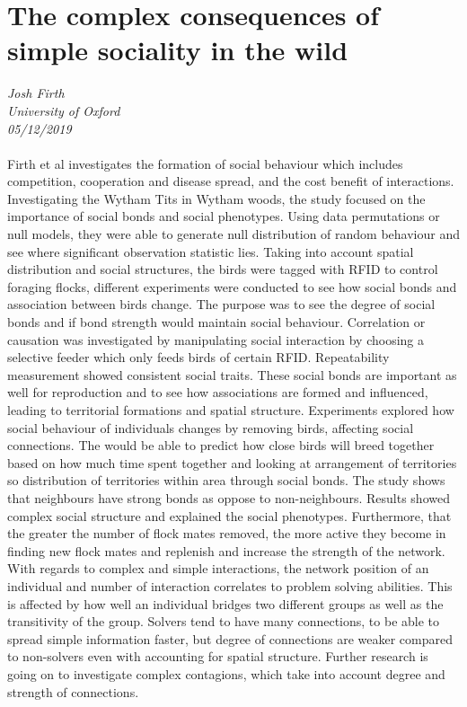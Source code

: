 \documentclass[11pt]{article}
\begin{document}
\section{The complex consequences of simple sociality in the wild}
\textit{Josh Firth\\University of Oxford\\05/12/2019}
\\
\\Firth et al investigates the formation of social behaviour which includes competition, cooperation and disease spread, and the cost benefit of interactions. Investigating the Wytham Tits in Wytham woods, the study focused on the importance of social bonds and social phenotypes. Using data permutations or null models, they were able to generate null distribution of random behaviour and see where significant observation statistic lies. Taking into account spatial distribution and social structures, the birds were tagged with RFID to control foraging flocks, different experiments were conducted to see how social bonds and association between birds change. The purpose was to see the degree of social bonds and if bond strength would maintain social behaviour. Correlation or causation was investigated by manipulating social interaction by choosing a selective feeder which only feeds birds of certain RFID. Repeatability measurement showed consistent social traits. These social bonds are important as well for reproduction and to see how associations are formed and influenced, leading to territorial formations and spatial structure. Experiments explored how social behaviour of individuals changes by removing birds, affecting social connections. The would be able to predict how close birds will breed together based on how much time spent together and looking at arrangement of territories so distribution of territories within area through social bonds. The study shows that neighbours have strong bonds as oppose to non-neighbours. Results showed complex social structure and explained the social phenotypes. Furthermore, that the greater the number of flock mates removed, the more active they become in finding new flock mates and replenish and increase the strength of the network. With regards to complex and simple interactions, the network position of an individual and number of interaction correlates to problem solving abilities. This is affected by how well an individual bridges two different groups as well as the transitivity of the group. Solvers tend to have many connections, to be able to spread simple information faster, but degree of connections are weaker compared to non-solvers even with accounting for spatial structure. Further research is going on to investigate complex contagions, which take into account degree and strength of connections.
\end{document}
